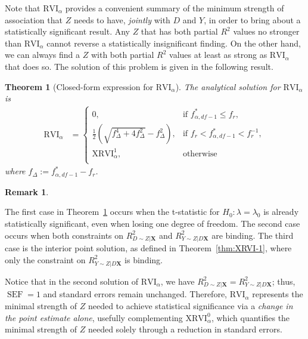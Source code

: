 \documentclass[sts]{imsart}
\theoremstyle{plain}
\newtheorem{theorem}{Theorem}
\theoremstyle{definition}
\newtheorem{remark}{Remark}
\newcommand{\df}{df}
\DeclareMathOperator{\SEF}{\text{SEF}}
\newcommand{\Ry}{R^2_{Y\sim Z | D\mathbf{X}}}
\newcommand{\Rd}{R^2_{D\sim Z | \mathbf{X}}}
\newcommand{\fstar}{f^*_{\alpha, \df-1}}
\newcommand{\XRVI}{\text{XRVI}}
\newcommand{\RVI}{\text{RVI}}
\begin{document}
Note that $\RVI_{\alpha}$ provides a convenient summary of the minimum strength of association that $Z$ needs to have, \emph{jointly} with $D$ and $Y$, in order to bring about a statistically significant result. Any $Z$ that has both partial $R^2$ values no stronger than $\RVI_{\alpha}$ cannot reverse a statistically insignificant finding. On the other hand,  we can always find a $Z$ with both partial $R^2$ values at least as strong as $\RVI_{\alpha}$ that does so. The solution of this problem is given in the following result.

\begin{theorem} [Closed-form expression for $\RVI_{\alpha}$]
\label{thm:RVI}
    The analytical solution for $\RVI_{\alpha}$ is
    \begin{align*}
        \RVI_{\alpha}
        &= 
        \begin{cases}
            0, &\text{if } \fstar \leq f_{r},  \\
            \tfrac{1}{2}\left({\scriptstyle  \sqrt{f_\Delta^4 + 4f_\Delta^2}-f_\Delta^2 }\right), &\text{if } f_{r} < \fstar < f_{r}^{-1}, \\
            \XRVI^{1}_{\alpha}, &\text{otherwise} \\
        \end{cases}
    \end{align*} 
    where $f_{\Delta} := \fstar - f_{r} $. 
\end{theorem}

\begin{remark}
\label{rmk:rvi-explanation}

The first case in Theorem~\ref{thm:RVI} occurs when the t-statistic for $H_0:\lambda = \lambda_0$ is already statistically significant, even when losing one degree of freedom. The second case occurs when both constraints on $\Rd$ and $\Ry$ are binding. The third case is the interior point solution, as defined in Theorem~\ref{thm:XRVI-1}, where only the constraint on $\Ry$ is binding. 
\end{remark}

Notice that in the second solution of \( \text{RVI}_{\alpha} \), we have \(\Rd = \Ry\); thus, \(\SEF = 1\) and standard errors remain unchanged. Therefore, \( \text{RVI}_{\alpha} \) represents the minimal strength of \( Z \) needed to achieve statistical significance via a \emph{change in the point estimate alone}, usefully complementing \(\XRVI^0_{\alpha}\), which quantifies the minimal strength of \( Z \) needed solely through a reduction in standard errors.
\end{document}
